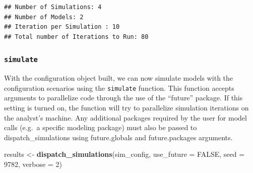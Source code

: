 \documentclass[
]{article}
\newenvironment{Shaded}{\begin{snugshade}}{\end{snugshade}}
\newcommand{\DataTypeTok}[1]{\textcolor[rgb]{0.13,0.29,0.53}{#1}}
\newcommand{\DecValTok}[1]{\textcolor[rgb]{0.00,0.00,0.81}{#1}}
\newcommand{\KeywordTok}[1]{\textcolor[rgb]{0.13,0.29,0.53}{\textbf{#1}}}
\newcommand{\NormalTok}[1]{#1}
\newcommand{\OtherTok}[1]{\textcolor[rgb]{0.56,0.35,0.01}{#1}}
\newcommand{\StringTok}[1]{\textcolor[rgb]{0.31,0.60,0.02}{#1}}
\begin{document}
\begin{verbatim}
## Number of Simulations: 4
## Number of Models: 2
## Iteration per Simulation : 10
## Total number of Iterations to Run: 80
\end{verbatim}

\hypertarget{simulate}{%
\subsubsection{\texorpdfstring{\texttt{simulate}}{simulate}}\label{simulate}}

With the configuration object built, we can now simulate models with the
configuration scenarios using the \texttt{simulate} function. This
function accepts arguments to parallelize code through the use of the
``future'' package. If this setting is turned on, the function will try
to parallelize simulation iterations on the analyst's machine. Any
additional packages required by the user for model calls (e.g.~a
specific modeling package) must also be passed to dispatch\_simulations
using future.globals and future.packages arguments.

\begin{Shaded}
\begin{Highlighting}[]
\NormalTok{results \textless{}{-}}\StringTok{ }\KeywordTok{dispatch\_simulations}\NormalTok{(sim\_config, }\DataTypeTok{use\_future =} \OtherTok{FALSE}\NormalTok{,}
    \DataTypeTok{seed =} \DecValTok{9782}\NormalTok{, }\DataTypeTok{verbose =} \DecValTok{2}\NormalTok{)}
\end{Highlighting}
\end{Shaded}
\end{document}
